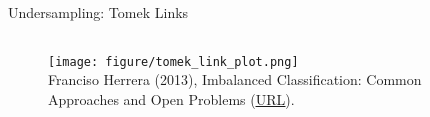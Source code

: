 \documentclass[11pt,compress,t,notes=noshow, xcolor=table]{beamer}
\begin{document}
\begin{frame}{Undersampling: Tomek Links}
{\begin{columns}
            \begin{column}{0.4\textwidth}
                \begin{figure}
                    \centering
                    \texttt{[image: figure/tomek\_link\_plot.png]}	
                    \tiny
                    \\ Franciso Herrera (2013), Imbalanced Classification: Common
                    Approaches and Open Problems (\href{https://sci2s.ugr.es/sites/default/files/files/TutorialsAndPlenaryTalks/SSTiC-Trends in-Classification-Imbalanced-data-sets.pdf}{\underline{URL}}).
                \end{figure}
            \end{column}
        \end{columns}
	   }
	\end{frame}
\end{document}
